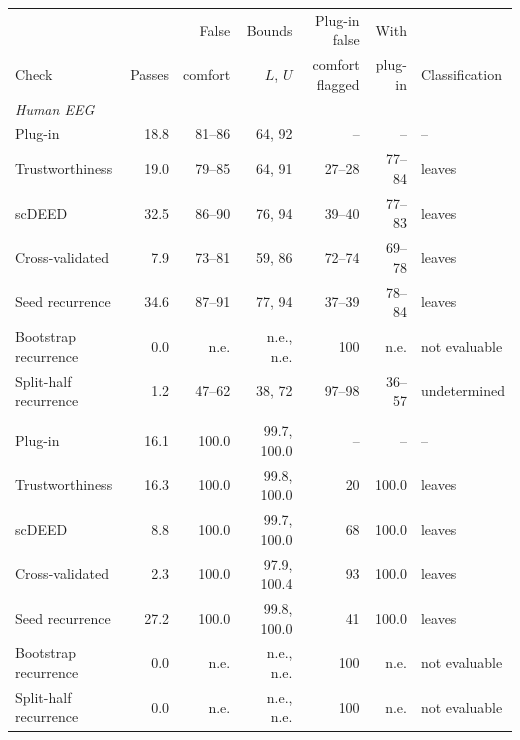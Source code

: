 \begin{tabular}{lrrrrrl}
\toprule
 & & False & Bounds & Plug-in false & With & \\
Check & Passes & comfort & $L$, $U$ & comfort flagged & plug-in & Classification \\
\midrule
\multicolumn{7}{l}{\textit{Human EEG}} \\
\quad Plug-in & 18.8 & 81--86 & 64, 92 & -- & -- & -- \\
\quad Trustworthiness & 19.0 & 79--85 & 64, 91 & 27--28 & 77--84 & leaves \\
\quad scDEED & 32.5 & 86--90 & 76, 94 & 39--40 & 77--83 & leaves \\
\quad Cross-validated & 7.9 & 73--81 & 59, 86 & 72--74 & 69--78 & leaves \\
\quad Seed recurrence & 34.6 & 87--91 & 77, 94 & 37--39 & 78--84 & leaves \\
\quad Bootstrap recurrence & 0.0 & n.e. & n.e., n.e. & 100 & n.e. & not evaluable \\
\quad Split-half recurrence & 1.2 & 47--62 & 38, 72 & 97--98 & 36--57 & undetermined \\
\addlinespace
\multicolumn{7}{l}{\textit{Mouse V1}} \\
\quad Plug-in & 16.1 & 100.0 & 99.7, 100.0 & -- & -- & -- \\
\quad Trustworthiness & 16.3 & 100.0 & 99.8, 100.0 & 20 & 100.0 & leaves \\
\quad scDEED & 8.8 & 100.0 & 99.7, 100.0 & 68 & 100.0 & leaves \\
\quad Cross-validated & 2.3 & 100.0 & 97.9, 100.4 & 93 & 100.0 & leaves \\
\quad Seed recurrence & 27.2 & 100.0 & 99.8, 100.0 & 41 & 100.0 & leaves \\
\quad Bootstrap recurrence & 0.0 & n.e. & n.e., n.e. & 100 & n.e. & not evaluable \\
\quad Split-half recurrence & 0.0 & n.e. & n.e., n.e. & 100 & n.e. & not evaluable \\
\bottomrule
\end{tabular}
